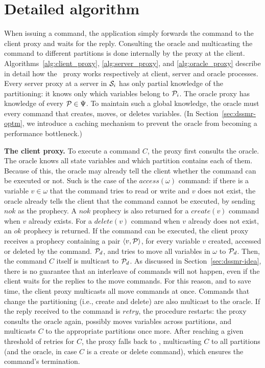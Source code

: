 \section{Detailed algorithm}
\label{sec:dssmr-detail}


When issuing a command, the application simply forwards the command to the
client proxy and waits for the reply. Consulting the oracle and multicasting the
command to different partitions is done internally by the proxy at the client.
Algorithms~\ref{alg:client_proxy}, \ref{alg:server_proxy}, and
\ref{alg:oracle_proxy} describe in detail how the \dssmr\ proxy works
respectively at client, server and oracle processes. Every server proxy at a
server in $\mathcal{S}_i$ has only partial knowledge of the partitioning: it knows only
which variables belong to $\mathcal{P}_i$. The oracle proxy has knowledge of every
$\mathcal{P} \in \Psi$. To maintain such a global knowledge, the oracle must \amdel{}
every command that creates, moves, or deletes variables. (In
Section~\ref{sec:dssmr-optm}, we introduce a caching mechanism to prevent the oracle
from becoming a performance bottleneck.)


\textbf{The client proxy.} To execute a command $C$, the proxy first consults
the oracle. The oracle knows all state variables and which partition contains
each of them. Because of this, the oracle may already tell the client whether
the command can be executed or not. Such is the case of the $access(\omega)$
command: if there is a variable $v \in \omega$ that the command tries to read or
write and $v$ does not exist, the oracle already tells the client that the
command cannot be executed, by sending $nok$ as the prophecy. A $nok$ prophecy
is also returned for a $create(v)$ command when $v$ already exists. For a
$delete(v)$ command when $v$ already does not exist, an $ok$ prophecy is
returned. If the command can be executed, the client proxy receives a prophecy
containing a pair $\langle v, \mathcal{P} \rangle$, for every variable $v$ created,
accessed or deleted by the command.  $\mathcal{P}_d$, and tries to move all variables in $\omega$ to $\mathcal{P}_d$.
Then, the command $C$ itself is multicast to $\mathcal{P}_d$. As discussed in
Section~\ref{sec:dssmr-idea}, there is no guarantee that an interleave of
commands will not happen, even if the client waits for the replies to the move
commands. For this reason, and to save time, the client proxy multicasts all
move commands at once. Commands that change the partitioning (i.e., create and
delete) are also multicast to the oracle. If the reply received to the command
is $retry$, the procedure restarts: the proxy consults the oracle again,
possibly moves variables across partitions, and multicasts $C$ to the
appropriate partitions once more. After reaching a given threshold of retries
for $C$, the proxy falls back to \ssmr{}, multicasting $C$ to all partitions
(and the oracle, in case $C$ is a create or delete command), which ensures the
command's termination.

